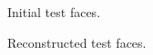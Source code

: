\begin{figure}[h!tbp]
        \caption{Initial test faces.}
\end{figure}

\begin{figure}[h!tbp]
        \caption{Reconstructed test faces.}
\end{figure}



